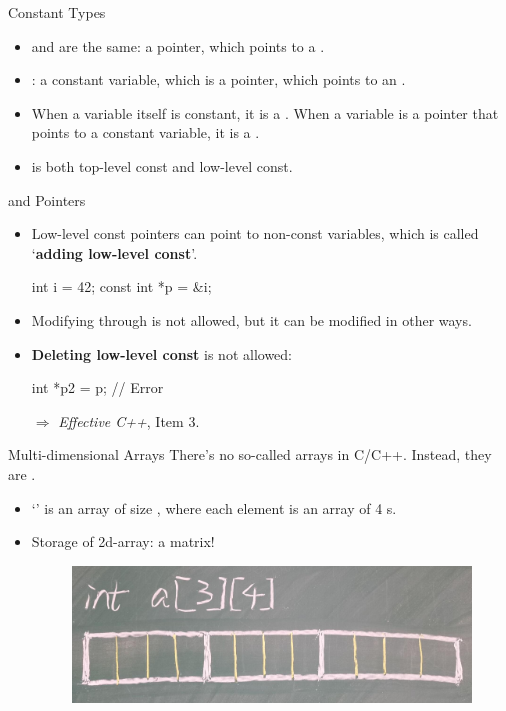 \documentclass{beamer}
\begin{document}
\begin{frame}{Constant Types}
	\begin{itemize}
		\item {} and  are the same: a pointer, which points to a  .
		\item {}: a constant variable, which is a pointer, which points to an .
		\pause
		\item When a variable itself is constant, it is a . When a variable is a pointer that points to a constant variable, it is a .
		\item {} is both top-level const and low-level const.
	\end{itemize}
\end{frame}

\begin{frame}[fragile]{ and Pointers}
	\begin{itemize}
		\item Low-level const pointers can point to non-const variables, which is called `\textbf{adding low-level const}'.
		\begin{cpp}
int i = 42;
const int *p = &i;
		\end{cpp}
		\item Modifying  through  is not allowed, but it can be modified in other ways.
		\pause
		\item \textbf{Deleting low-level const} is not allowed:
		\begin{cpp}
int *p2 = p; // Error
		\end{cpp}
		\pause
		\item[\(\Rightarrow\)] \textit{Effective C++}, Item 3.
	\end{itemize}
\end{frame}

\begin{frame}{Multi-dimensional Arrays}
	There's no so-called  arrays in C/C++. Instead, they are .
	\begin{itemize}
		\item {} `' is an array of size , where each element is an array of 4 s.
		\pause
		\item Storage of 2d-array:  a matrix!
		\begin{figure}[h]
			\centering
			\includegraphics[scale=0.2]{figures/2darray.jpg}
		\end{figure}
	\end{itemize}
\end{frame}
\end{document}
